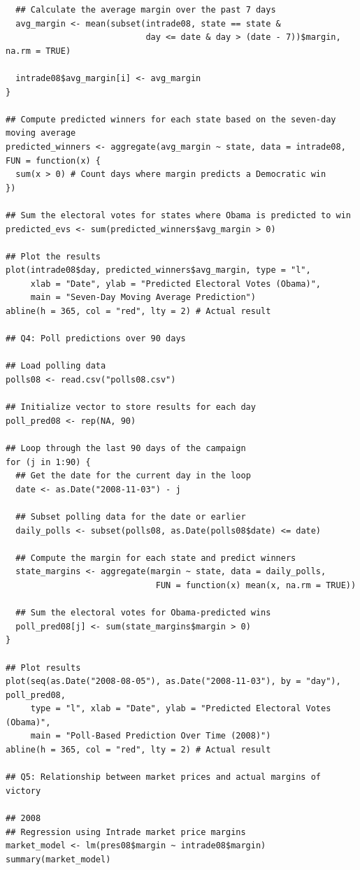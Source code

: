 \documentclass[12pt]{article}
\begin{document}
{\begin{verbatim}
  ## Calculate the average margin over the past 7 days
  avg_margin <- mean(subset(intrade08, state == state & 
                            day <= date & day > (date - 7))$margin, na.rm = TRUE)
  
  intrade08$avg_margin[i] <- avg_margin
}

## Compute predicted winners for each state based on the seven-day moving average
predicted_winners <- aggregate(avg_margin ~ state, data = intrade08, FUN = function(x) {
  sum(x > 0) # Count days where margin predicts a Democratic win
})

## Sum the electoral votes for states where Obama is predicted to win
predicted_evs <- sum(predicted_winners$avg_margin > 0)

## Plot the results
plot(intrade08$day, predicted_winners$avg_margin, type = "l",
     xlab = "Date", ylab = "Predicted Electoral Votes (Obama)",
     main = "Seven-Day Moving Average Prediction")
abline(h = 365, col = "red", lty = 2) # Actual result

## Q4: Poll predictions over 90 days

## Load polling data
polls08 <- read.csv("polls08.csv")

## Initialize vector to store results for each day
poll_pred08 <- rep(NA, 90)

## Loop through the last 90 days of the campaign
for (j in 1:90) {
  ## Get the date for the current day in the loop
  date <- as.Date("2008-11-03") - j
  
  ## Subset polling data for the date or earlier
  daily_polls <- subset(polls08, as.Date(polls08$date) <= date)
  
  ## Compute the margin for each state and predict winners
  state_margins <- aggregate(margin ~ state, data = daily_polls, 
                              FUN = function(x) mean(x, na.rm = TRUE))
  
  ## Sum the electoral votes for Obama-predicted wins
  poll_pred08[j] <- sum(state_margins$margin > 0)
}

## Plot results
plot(seq(as.Date("2008-08-05"), as.Date("2008-11-03"), by = "day"), poll_pred08,
     type = "l", xlab = "Date", ylab = "Predicted Electoral Votes (Obama)",
     main = "Poll-Based Prediction Over Time (2008)")
abline(h = 365, col = "red", lty = 2) # Actual result

## Q5: Relationship between market prices and actual margins of victory

## 2008
## Regression using Intrade market price margins
market_model <- lm(pres08$margin ~ intrade08$margin)
summary(market_model)


\end{verbatim}}
\end{document}
